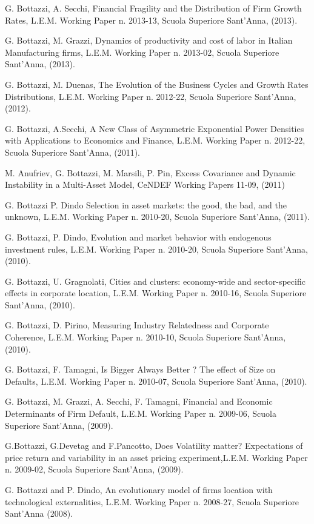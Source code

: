 \documentclass[a4paper]{article}
\begin{document}
G. Bottazzi, A. Secchi, Financial Fragility and the Distribution of
Firm Growth Rates, L.E.M.  Working Paper n. 2013-13, Scuola Superiore
Sant'Anna, (2013).

G. Bottazzi, M. Grazzi, Dynamics of productivity and cost of labor in
Italian Manufacturing firms, L.E.M.  Working Paper n. 2013-02, Scuola
Superiore Sant'Anna, (2013).

G. Bottazzi, M. Duenas, The Evolution of the Business Cycles and
Growth Rates Distributions, L.E.M.  Working Paper n. 2012-22, Scuola
Superiore Sant'Anna, (2012).

G. Bottazzi, A.Secchi, A New Class of Asymmetric Exponential Power
Densities with Applications to Economics and Finance, L.E.M.  Working
Paper n. 2012-22, Scuola Superiore Sant'Anna, (2011).

M. Anufriev, G. Bottazzi, M. Marsili, P. Pin, Excess Covariance and
Dynamic Instability in a Multi-Asset Model, CeNDEF Working Papers
11-09, (2011)

G. Bottazzi P. Dindo Selection in asset markets: the good, the bad,
and the unknown, L.E.M.  Working Paper n. 2010-20, Scuola Superiore
Sant'Anna, (2011).

G. Bottazzi, P. Dindo, Evolution and market behavior with endogenous
investment rules, L.E.M.  Working Paper n. 2010-20, Scuola Superiore
Sant'Anna, (2010).

G. Bottazzi, U. Gragnolati, Cities and clusters: economy-wide and
sector-specific effects in corporate location, L.E.M.  Working Paper
n. 2010-16, Scuola Superiore Sant'Anna, (2010).

G. Bottazzi, D. Pirino, Measuring Industry Relatedness and Corporate
Coherence, L.E.M.  Working Paper n. 2010-10, Scuola Superiore
Sant'Anna, (2010).

G. Bottazzi, F. Tamagni, Is Bigger Always Better ? The effect of Size
on Defaults, L.E.M.  Working Paper n. 2010-07, Scuola Superiore
Sant'Anna, (2010).

G. Bottazzi, M. Grazzi, A. Secchi, F. Tamagni, Financial and Economic
Determinants of Firm Default, L.E.M.  Working Paper n. 2009-06, Scuola
Superiore Sant'Anna, (2009).

G.Bottazzi, G.Devetag and F.Pancotto, Does Volatility matter?
Expectations of price return and variability in an asset pricing
experiment,L.E.M.  Working Paper n. 2009-02, Scuola Superiore Sant'Anna,
(2009).

G. Bottazzi and P. Dindo, An evolutionary model of firms location with
technological externalities, L.E.M.  Working Paper n. 2008-27, Scuola
Superiore Sant'Anna (2008).
\end{document}
